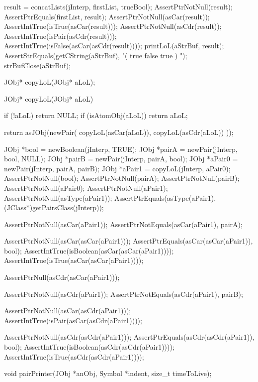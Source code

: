   result = concatLists(jInterp, firstList, trueBool);
  AssertPtrNotNull(result);
  AssertPtrEquals(firstList, result);
  AssertPtrNotNull(asCar(result));
  AssertIntTrue(isTrue(asCar(result)));
  AssertPtrNotNull(asCdr(result));
  AssertIntTrue(isPair(asCdr(result)));
  AssertIntTrue(isFalse(asCar(asCdr(result))));
  printLoL(aStrBuf, result);
  AssertStrEquals(getCString(aStrBuf), "( true false true ) ");
  strBufClose(aStrBuf);
\stopCTest
\skipTestCase
\stopTestSuite

\startTestSuite[copyLoL]

\startCHeader
JObj* copyLoL(JObj* aLoL);
\stopCHeader

\startCCode
JObj* copyLoL(JObj* aLoL) {
  if (!aLoL) return NULL;
  if (isAtomObj(aLoL)) return aLoL;

  return asJObj(newPair(
    copyLoL(asCar(aLoL)),
    copyLoL(asCdr(aLoL))
  ));
}
\stopCCode


\startCTest
  JObj *bool   = newBoolean(jInterp, TRUE);
  JObj *pairA  = newPair(jInterp, bool, NULL);
  JObj *pairB  = newPair(jInterp, pairA, bool);
  JObj *aPair0 = newPair(jInterp, pairA, pairB);
  JObj *aPair1 = copyLoL(jInterp, aPair0);
  AssertPtrNotNull(bool);
  AssertPtrNotNull(pairA);
  AssertPtrNotNull(pairB);
  AssertPtrNotNull(aPair0);
  AssertPtrNotNull(aPair1);
  AssertPtrNotNull(asType(aPair1));
  AssertPtrEquals(asType(aPair1),
    (JClass*)getPairsClass(jInterp));

  AssertPtrNotNull(asCar(aPair1));
  AssertPtrNotEquals(asCar(aPair1), pairA);

  AssertPtrNotNull(asCar(asCar(aPair1)));
  AssertPtrEquals(asCar(asCar(aPair1)), bool);
  AssertIntTrue(isBoolean(asCar(asCar(aPair1))));
  AssertIntTrue(isTrue(asCar(asCar(aPair1))));

  AssertPtrNull(asCdr(asCar(aPair1)));

  AssertPtrNotNull(asCdr(aPair1));
  AssertPtrNotEquals(asCdr(aPair1), pairB);

  AssertPtrNotNull(asCar(asCdr(aPair1)));
  AssertIntTrue(isPair(asCar(asCdr(aPair1))));

  AssertPtrNotNull(asCdr(asCdr(aPair1)));
  AssertPtrEquals(asCdr(asCdr(aPair1)), bool);
  AssertIntTrue(isBoolean(asCdr(asCdr(aPair1))));
  AssertIntTrue(isTrue(asCdr(asCdr(aPair1))));
\stopCTest
\skipTestCase
\stopTestSuite

\startTestSuite[pairPrinter]

\startCHeader
void pairPrinter(JObj *anObj, Symbol *indent, size_t timeToLive);
\stopCHeader

